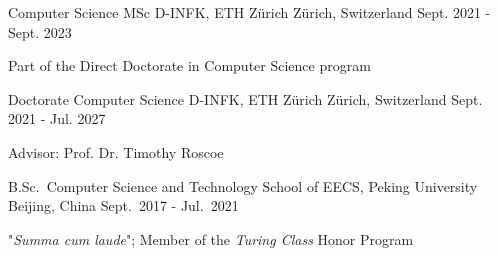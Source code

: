 

\begin{cventries}

  \cventry
    {Computer Science MSc} %
    {D-INFK, ETH Zürich} %
    {Zürich, Switzerland} %
    {Sept. 2021 - Sept. 2023} %
    {
      \begin{cvitems} %
      \item {Part of the Direct Doctorate in Computer Science program}
      \end{cvitems}
    }

  \cventry
    {Doctorate Computer Science} %
    {D-INFK, ETH Zürich} %
    {Zürich, Switzerland} %
    {Sept. 2021 - Jul. 2027} %
    {
      \begin{cvitems} %
      \item {Advisor: Prof. Dr. Timothy Roscoe}
      \end{cvitems}
    }

  \cventry
    {B.Sc.\ Computer Science and Technology} %
    {School of EECS, Peking University} %
    {Beijing, China} %
    {Sept.\ 2017 - Jul.\ 2021} %
    {
      \begin{cvitems} %
      \item {"\emph{Summa cum laude}"; Member of the \emph{Turing Class} Honor Program}
      \end{cvitems}
    }

\end{cventries}
